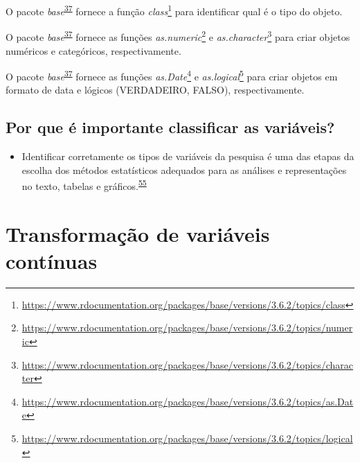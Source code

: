 \documentclass[
  a4paper,
]{book}
\providecommand{\tightlist}{%
  \setlength{\itemsep}{0pt}\setlength{\parskip}{0pt}}
\renewcommand{\href}[2]{#2\footnote{\url{#1}}}
\newenvironment{infobox}[1]
  {
  \begin{itemize}
  \renewcommand{\labelitemi}{
    \raisebox{-.7\height}[0pt][0pt]{
      {\setkeys{Gin}{width=3em,keepaspectratio}
        \texttt{[image: \#1]}}
    }
  }
  \setlength{\fboxsep}{1em}
  \begin{blackbox}
  \item
  }
  {
  \end{blackbox}
  \end{itemize}
  }
\begin{document}
\begin{infobox}{images/Rlogo}
O pacote \emph{base}\textsuperscript{\protect\hyperlink{ref-base-2}{37}} fornece a função \href{https://www.rdocumentation.org/packages/base/versions/3.6.2/topics/class}{\emph{class}} para identificar qual é o tipo do objeto.

\end{infobox}

\begin{infobox}{images/Rlogo}
O pacote \emph{base}\textsuperscript{\protect\hyperlink{ref-base-2}{37}} fornece as funções \href{https://www.rdocumentation.org/packages/base/versions/3.6.2/topics/numeric}{\emph{as.numeric}} e \href{https://www.rdocumentation.org/packages/base/versions/3.6.2/topics/character}{\emph{as.character}} para criar objetos numéricos e categóricos, respectivamente.

\end{infobox}

\begin{infobox}{images/Rlogo}
O pacote \emph{base}\textsuperscript{\protect\hyperlink{ref-base-2}{37}} fornece as funções \href{https://www.rdocumentation.org/packages/base/versions/3.6.2/topics/as.Date}{\emph{as.Date}} e \href{https://www.rdocumentation.org/packages/base/versions/3.6.2/topics/logical}{\emph{as.logical}} para criar objetos em formato de data e lógicos (VERDADEIRO, FALSO), respectivamente.

\end{infobox}

\hypertarget{por-que-uxe9-importante-classificar-as-variuxe1veis}{%
\subsection{Por que é importante classificar as variáveis?}\label{por-que-uxe9-importante-classificar-as-variuxe1veis}}

\begin{itemize}
\tightlist
\item
  Identificar corretamente os tipos de variáveis da pesquisa é uma das etapas da escolha dos métodos estatísticos adequados para as análises e representações no texto, tabelas e gráficos.\textsuperscript{\protect\hyperlink{ref-Dettori2018}{55}}
\end{itemize}

\hypertarget{transformacao}{%
\section{Transformação de variáveis contínuas}\label{transformacao}}
\end{document}

